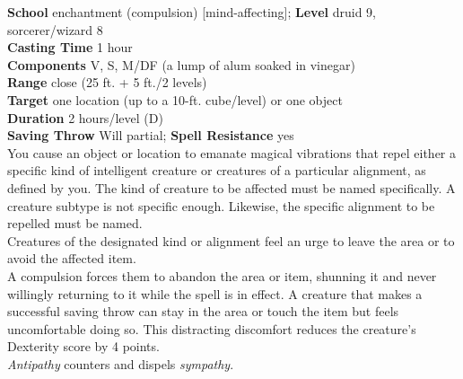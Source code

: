 \textbf{School} enchantment (compulsion) [mind-affecting]; \textbf{Level} druid 9, sorcerer/wizard 8\\
\textbf{Casting Time} 1 hour\\
\textbf{Components} V, S, M/DF (a lump of alum soaked in vinegar)\\
\textbf{Range} close (25 ft. + 5 ft./2 levels)\\
\textbf{Target} one location (up to a 10-ft. cube/level) or one object\\
\textbf{Duration} 2 hours/level (D)\\
\textbf{Saving Throw }Will partial; \textbf{Spell Resistance} yes\\
You cause an object or location to emanate magical vibrations that repel either a specific kind of intelligent creature or creatures of a particular alignment, as defined by you. The kind of creature to be affected must be named specifically. A creature subtype is not specific enough. Likewise, the specific alignment to be repelled must be named.\\
Creatures of the designated kind or alignment feel an urge to leave the area or to avoid the affected item.\\
A compulsion forces them to abandon the area or item, shunning it and never willingly returning to it while the spell is in effect. A creature that makes a successful saving throw can stay in the area or touch the item but feels uncomfortable doing so. This distracting discomfort reduces the creature's Dexterity score by 4 points.\\
\textit{Antipathy }counters and dispels \textit{sympathy}.\\
